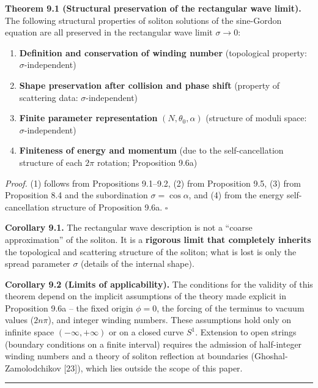 \documentclass[a4paper,11pt]{article}
\providecommand{\tightlist}{\setlength{\itemsep}{0pt}\setlength{\parskip}{0pt}}
\begin{document}
\textbf{Theorem 9.1 (Structural preservation of the rectangular wave
limit).} The following structural properties of soliton solutions of the
sine-Gordon equation are all preserved in the rectangular wave limit
\(\sigma \to 0\):

\begin{enumerate}
\def\labelenumi{\arabic{enumi}.}
\tightlist
\item
  \textbf{Definition and conservation of winding number} (topological
  property: \(\sigma\)-independent)
\item
  \textbf{Shape preservation after collision and phase shift} (property
  of scattering data: \(\sigma\)-independent)
\item
  \textbf{Finite parameter representation} \((N, \theta_0, \alpha)\)
  (structure of moduli space: \(\sigma\)-independent)
\item
  \textbf{Finiteness of energy and momentum} (due to the
  self-cancellation structure of each \(2\pi\) rotation; Proposition
  9.6a)
\end{enumerate}

\emph{Proof.} (1) follows from Propositions 9.1--9.2, (2) from
Proposition 9.5, (3) from Proposition 8.4 and the subordination
\(\sigma = \cos\alpha\), and (4) from the energy self-cancellation
structure of Proposition 9.6a. \(\square\)

\textbf{Corollary 9.1.} The rectangular wave description is not a
``coarse approximation'' of the soliton. It is a \textbf{rigorous limit
that completely inherits} the topological and scattering structure of
the soliton; what is lost is only the spread parameter \(\sigma\)
(details of the internal shape).

\textbf{Corollary 9.2 (Limits of applicability).} The conditions for the
validity of this theorem depend on the implicit assumptions of the
theory made explicit in Proposition 9.6a -- the fixed origin
\(\phi = 0\), the forcing of the terminus to vacuum values (\(2n\pi\)),
and integer winding numbers. These assumptions hold only on infinite
space \((-\infty,+\infty)\) or on a closed curve \(S^1\). Extension to
open strings (boundary conditions on a finite interval) requires the
admission of half-integer winding numbers and a theory of soliton
reflection at boundaries (Ghoshal-Zamolodchikov {[}23{]}), which lies
outside the scope of this paper.

\begin{center}\rule{0.5\linewidth}{0.5pt}\end{center}
\end{document}
